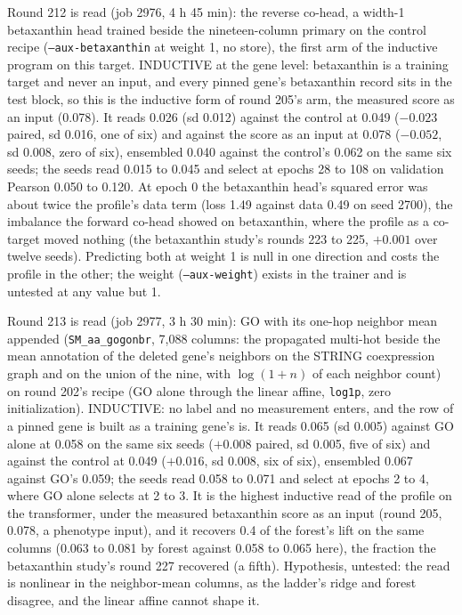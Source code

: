 Round 212 is read (job 2976, 4 h 45 min): the reverse co-head, a width-1 betaxanthin
head trained beside the nineteen-column primary on the control recipe
(\texttt{--aux-betaxanthin} at weight 1, no store), the first arm of the inductive
program on this target. INDUCTIVE at the gene level: betaxanthin is a training target
and never an input, and every pinned gene's betaxanthin record sits in the test block,
so this is the inductive form of round 205's arm, the measured score as an input
(0.078). It reads 0.026 (sd 0.012) against the control at 0.049 ($-0.023$ paired, sd
0.016, one of six) and against the score as an input at 0.078 ($-0.052$, sd 0.008,
zero of six), ensembled 0.040 against the control's 0.062 on the same six seeds; the
seeds read 0.015 to 0.045 and select at epochs 28 to 108 on validation Pearson 0.050 to
0.120. At epoch 0 the betaxanthin head's squared error was about twice the profile's
data term (loss 1.49 against data 0.49 on seed 2700), the imbalance the forward co-head
showed on betaxanthin, where the profile as a co-target moved nothing (the betaxanthin
study's rounds 223 to 225, $+0.001$ over twelve seeds). Predicting both at weight 1 is
null in one direction and costs the profile in the other; the weight
(\texttt{--aux-weight}) exists in the trainer and is untested at any value but 1.

Round 213 is read (job 2977, 3 h 30 min): GO with its one-hop neighbor mean appended
(\texttt{SM\_aa\_gogonbr}, 7,088 columns: the propagated multi-hot beside the mean
annotation of the deleted gene's neighbors on the STRING coexpression graph and on the
union of the nine, with $\log(1 + n)$ of each neighbor count) on round 202's recipe
(GO alone through the linear affine, \texttt{log1p}, zero initialization). INDUCTIVE:
no label and no measurement enters, and the row of a pinned gene is built as a training
gene's is. It reads 0.065 (sd 0.005) against GO alone at 0.058 on the same six seeds
($+0.008$ paired, sd 0.005, five of six) and against the control at 0.049 ($+0.016$,
sd 0.008, six of six), ensembled 0.067 against GO's 0.059; the seeds read 0.058 to
0.071 and select at epochs 2 to 4, where GO alone selects at 2 to 3. It is the highest
inductive read of the profile on the transformer, under the measured betaxanthin score
as an input (round 205, 0.078, a phenotype input), and it recovers 0.4 of the forest's
lift on the same columns (0.063 to 0.081 by forest against 0.058 to 0.065 here), the
fraction the betaxanthin study's round 227 recovered (a fifth). Hypothesis, untested:
the read is nonlinear in the neighbor-mean columns, as the ladder's ridge and forest
disagree, and the linear affine cannot shape it.




